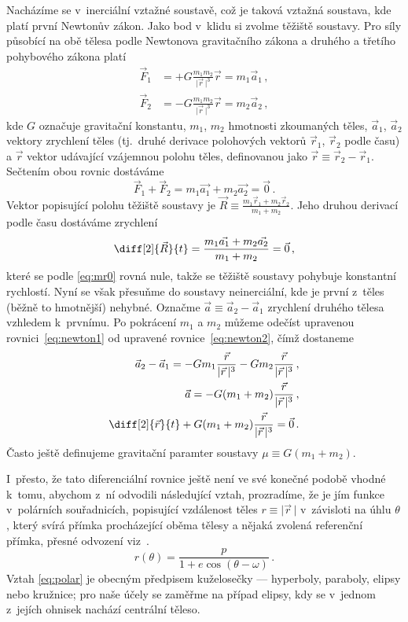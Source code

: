 \documentclass[A4paper, 12pt, oneside]{book}%
\newcommand{\abs}[1]{\lvert #1 \,\rvert}
\begin{document}
Nacházíme se v~inerciální vztažné soustavě, což je taková vztažná soustava, kde platí první Newtonův zákon. Jako bod v~klidu si zvolme těžiště soustavy. Pro síly působící na obě tělesa podle Newtonova gravitačního zákona a druhého a třetího pohybového zákona platí
\begin{align} 
	\vec{F}_1 &= +G\frac{m_1m_2}{\abs{\vec{r}}^3}\vec{r} = m_1\vec{a}_1\,, \label{eq:newton1} \\
	\vec{F}_2 &= -G\frac{m_1m_2}{\abs{\vec{r}}^3}\vec{r} = m_2\vec{a}_2\,, \label{eq:newton2}
\end{align}
kde $G$ označuje gravitační konstantu, $m_1$, $m_2$ hmotnosti zkoumaných těles, $\vec{a}_1$, $\vec{a}_2$ vektory zrychlení těles (tj.\ druhé derivace polohových vektorů $\vec{r}_1$, $\vec{r}_2$ podle času) a $\vec{r}$ vektor udávající vzájemnou polohu těles, definovanou jako $\vec{r} \equiv \vec{r}_2 - \vec{r}_1$. Sečtením obou rovnic dostáváme
\begin{equation} \label{eq:mr0}
	\vec{F}_1 + \vec{F}_2 = m_1\vec{a_1} + m_2\vec{a_2} = \vec{0}\,.
\end{equation}
Vektor popisující polohu těžiště soustavy je $\vec{R} \equiv \frac{m_1\vec{r}_1 + m_2\vec{r}_2}{m_1 + m_2}$. Jeho druhou derivací podle času dostáváme zrychlení
\begin{equation*}
	\diff[2]{\vec{R}}{t} = \frac{m_1\vec{a_1} + m_2\vec{a_2}}{m_1+m_2} = \vec{0}\,,
\end{equation*}
které se podle \eqref{eq:mr0} rovná nule, takže se těžiště soustavy pohybuje konstantní rychlostí.
\newpage
Nyní se však přesuňme do soustavy neinerciální, kde je první z~těles (běžně to hmotnější) nehybné. Označme $\vec{a}\equiv\vec{a}_2-\vec{a}_1$ zrychlení druhého tělesa vzhledem k~prvnímu. Po pokrácení $m_1$ a $m_2$ můžeme odečíst upravenou rovnici~\eqref{eq:newton1} od upravené rovnice~\eqref{eq:newton2}, čímž dostaneme
\begin{align}
	\nonumber \vec{a}_2 - \vec{a}_1 = -Gm_1\frac{\vec{r}}{\abs{\vec{r}}^3}-Gm_2\frac{\vec{r}}{\abs{\vec{r}}^3}\,, \\
	\nonumber \vec{a} = -G(m_1+m_2)\frac{\vec{r}}{\abs{\vec{r}}^3}\,, \\
		\diff[2]{\vec{r}}{t} + G(m_1+m_2)\frac{\vec{r}}{\abs{\vec{r}}^3} = \vec{0}\,.	
\end{align}
Často ještě definujeme gravitační paramter soustavy $\mu\equiv G(m_1+m_2)$.

I~přesto, že tato diferenciální rovnice ještě není ve své konečné podobě vhodné k~tomu, abychom z~ní odvodili následující vztah, prozradíme, že je jím funkce v~polárních souřadnicích, popisující vzdálenost těles $r\equiv\abs{\vec{r}}$ v~závisloti na úhlu $\theta$, který svírá přímka procházející oběma tělesy a nějaká zvolená referenční přímka, přesné odvození viz~\cite{murray99}.
\begin{equation} \label{eq:polar}
	r(\theta)=\frac{p}{1+e\cos{(\theta-\omega)}}\,.
\end{equation}
Vztah \eqref{eq:polar} je obecným předpisem kuželosečky --- hyperboly, paraboly, elipsy nebo kružnice; pro naše účely se zaměřme na případ elipsy, kdy se v~jednom z~jejích ohnisek nachází centrální těleso.
\end{document}

